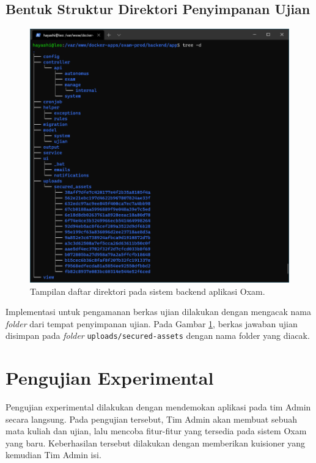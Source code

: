     \subsection{Bentuk Struktur Direktori Penyimpanan Ujian}
    \begin{figure}[htb]
        \centering
        \includegraphics[width=0.6\paperwidth]{Gambar/Screenshot 2021-01-16 014010.png}
        \caption{Tampilan daftar direktori pada sistem backend aplikasi Oxam.}
        \label{fig:dirlisting}
    \end{figure}
    Implementasi untuk pengamanan berkas ujian dilakukan dengan mengacak nama \textit{folder}
    dari tempat penyimpanan ujian. Pada Gambar \ref{fig:dirlisting}, berkas jawaban ujian disimpan pada
    \textit{folder} \texttt{uploads/secured-assets} dengan nama folder yang diacak.


\section{Pengujian Experimental}
    Pengujian experimental dilakukan dengan mendemokan aplikasi pada tim Admin secara langsung. Pada pengujian
    tersebut, Tim Admin akan membuat sebuah mata kuliah dan ujian, lalu mencoba fitur-fitur yang tersedia
    pada sistem Oxam yang baru. Keberhasilan tersebut dilakukan dengan memberikan kuisioner yang kemudian
    Tim Admin isi.
    
